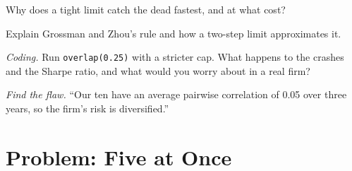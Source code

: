 \begin{exercise}[$\star\star$]\label{exo:s1:running-a-multi-strategy-book:5}
Why does a tight limit catch the dead  fastest, and at what cost?
\end{exercise}

\begin{exercise}[$\star\star$]\label{exo:s1:running-a-multi-strategy-book:6}
Explain Grossman and Zhou's rule and how a two-step  limit approximates it.
\end{exercise}

\begin{exercise}[$\star\star\star$]\label{exo:s1:running-a-multi-strategy-book:7}
\emph{Coding.} Run \texttt{overlap(0.25)} with a stricter cap. What happens to the crashes and the Sharpe ratio, and what would you worry about in a real
firm?
\end{exercise}

\begin{exercise}[$\star\star\star$]\label{exo:s1:running-a-multi-strategy-book:8}
\emph{Find the flaw.} ``Our ten  have an average pairwise correlation of 0.05 over three years, so the firm's risk is diversified.''
\end{exercise}

\section{Problem: Five at Once}

